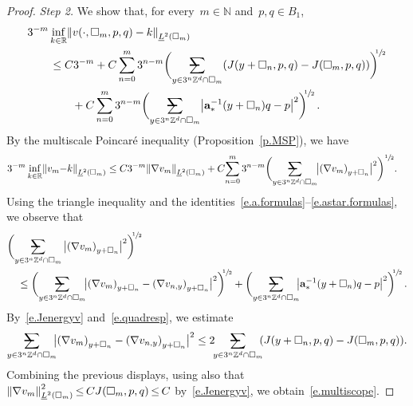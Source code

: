 \documentclass[11pt]{article} %
\makeatletter
\let\oldsquare\square %
\renewcommand{\square}{\oldsquare}
\numberwithin{equation}{section}
\theoremstyle{definition}
\let\originalleft\left
\let\originalright\right
\renewcommand{\left}{\mathopen{}\mathclose\bgroup\originalleft}
\renewcommand{\right}{\aftergroup\egroup\originalright}
\newcommand*{\N}{\ensuremath{\mathbb{N}}}
\newcommand*{\R}{\ensuremath{\mathbb{R}}}
\newcommand*{\Zd}{\ensuremath{\mathbb{Z}^d}}
\renewcommand{\a}{\mathbf{a}}
\newcommand{\cu}{\square}
\newcommand{\avsum}{\mathop{\mathpalette\avsuminner\relax}\displaylimits}
\newcommand\avsuminner[2]{%
  {\sbox0{$\m@th#1\sum$}%
   \vphantom{\usebox0}%
   \ooalign{%
     \hidewidth
     \smash{\,\rule[.23em]{8.8pt}{1.1pt} \relax}%
     \hidewidth\cr
     $\m@th#1\sum$\cr
   }%
  }%
}
\makeatother
\begin{document}
\begin{proof}
\emph{Step 2.} We show that,
for every~$m\in\N$ and~$p,q\in B_1$, 
\begin{align}
\label{e.multiscope}
\lefteqn{
3^{-m} 
\inf_{k\in\R} 
\left\| v(\cdot,\cu_m,p,q) - k \right\|_{\underline{L}^2(\cu_m)} 
} \qquad & 
\notag \\ &
\leq
C3^{-m} 
+
C
\sum_{n=0}^{{m}} 3^{n-m} 
\biggl(
\avsum_{y\in 3^{n}\Zd\cap \cu_m} 
( J(y+\cu_{n},p,q) - J (\cu_m,p,q) )
\biggr)^{\!\!\sfrac12}
\notag \\ & \qquad 
+
C\sum_{n=0}^{{m}} 3^{n-m} 
\biggl(\avsum_{y\in 3^n\Zd\cap \cu_{m}} 
\left| \a_*^{-1}(y+\cu_n) q - p\right|^2
\biggr)^{\!\!\sfrac12}
\,.
\end{align}
By the multiscale Poincar\'e inequality (Proposition~\ref{p.MSP}), we have
\begin{align*}
3^{-m} 
\inf_{k\in\R} 
\left\| v_m {-} k \right\|_{\underline{L}^2(\cu_m)} 
&
\leq 
C3^{-m} \left\| \nabla v_m \right\|_{\underline{L}^2(\cu_m)} 
+
C \! 
\sum_{n=0}^{m} 3^{n-m} 
\biggl( \avsum_{y\in 3^n\Zd\cap \cu_{m}} \!\!
\big| \left( \nabla v_m \right)_{y+\cu_n} \big|^2 \biggr)^{\sfrac12}
.
\end{align*}
Using the triangle inequality and the identities~\eqref{e.a.formulas}--\eqref{e.astar.formulas}, we observe that 
\begin{align*}
\lefteqn{
\biggl(
\avsum_{y\in 3^n\Zd\cap \cu_{m}} 
\big| \left( \nabla v_m \right)_{y+\cu_n} \big|^2\biggr)^{\!\!\sfrac12}
} \quad & 
\\ &
\leq 
\biggl(\avsum_{y\in 3^n\Zd\cap \cu_{m}} \!\!
\big|  \left( \nabla v_{m} \right)_{y+\cu_n} -  \left( \nabla v_{n,y} \right)_{y+\cu_n} \big|^2\biggr)^{\!\!\sfrac12}
+
\biggl(\avsum_{y\in 3^n\Zd\cap \cu_{m}} \!\!
\left| \a_*^{-1}(y+\cu_n) q - p\right|^2
\biggr)^{\!\!\sfrac12}
\,.
\end{align*}
By~\eqref{e.Jenergyv} and~\eqref{e.quadresp}, we estimate
\begin{align*}
\avsum_{y\in 3^n\Zd\cap \cu_{m}} \!\!\!
\big|  \left( \nabla v_{m} \right)_{y+\cu_n}  - \left( \nabla v_{n,y} \right)_{y+\cu_n} \big|^2
\leq 
2 \!\!
\avsum_{y\in 3^{n}\Zd\cap \cu_m} \!\!
( J(y+\cu_{n},p,q) - J (\cu_m,p,q) )
.
\end{align*}
Combining the previous displays, using also that $\left\| \nabla v_m \right\|_{\underline{L}^2(\cu_m)}^2  \hspace{-1pt}  \leq \hspace{-1pt} CJ(\cu_m,p,q) \hspace{-1pt} \leq \hspace{-1pt} C$ by~\eqref{e.Jenergyv}, we obtain~\eqref{e.multiscope}.



\end{proof}
\end{document}
